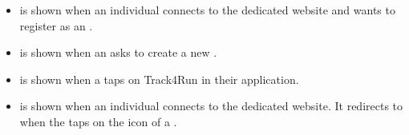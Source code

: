 \documentclass[../DD.tex]{subfiles}
\begin{document}
\begin{itemize}
		\item {} is shown when an individual connects to the  dedicated website and wants to register as an .
		\item {} is shown when an  asks to create a new .
		\item {} is shown when a  taps on Track4Run in their application.
		\item {} is shown when an individual connects to the  dedicated website. It redirects to  when the  taps on the icon of a .
	\end{itemize}
\thispagestyle{fancy}
 
\end{document}
